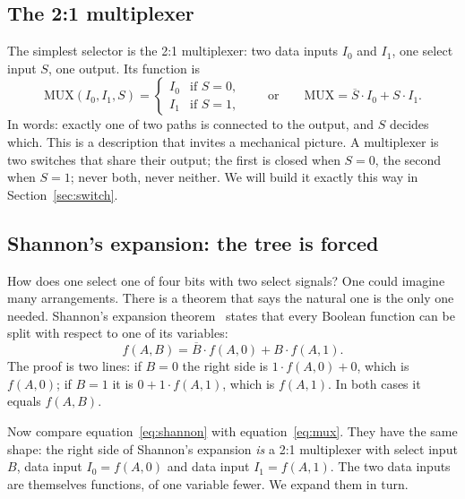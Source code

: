 \documentclass[11pt,a4paper]{article}
\newcommand{\ovl}[1]{\overline{#1}}
\begin{document}
\subsection{The 2:1 multiplexer}

The simplest selector is the 2:1 multiplexer: two data inputs $I_0$ and
$I_1$, one select input $S$, one output. Its function is
\begin{equation}
    \mathrm{MUX}(I_0,I_1,S) = \begin{cases} I_0 & \text{if } S=0,\\
                                             I_1 & \text{if } S=1,\end{cases}
    \qquad\text{or}\qquad
    \mathrm{MUX} = \ovl{S}\cdot I_0 + S\cdot I_1 .
    \label{eq:mux}
\end{equation}
In words: exactly one of two paths is connected to the output, and $S$
decides which. This is a description that invites a mechanical picture.
A multiplexer is two switches that share their output; the first is
closed when $S=0$, the second when $S=1$; never both, never neither.
We will build it exactly this way in Section~\ref{sec:switch}.

\subsection{Shannon's expansion: the tree is forced}

How does one select one of four bits with two select signals? One could
imagine many arrangements. There is a theorem that says the natural
one is the only one needed. Shannon's expansion
theorem~\cite{Shannon1938,Shannon1949} states that every Boolean
function can be split with respect to one of its variables:
\begin{equation}
    f(A,B) = \ovl{B}\cdot f(A,0) + B\cdot f(A,1).
    \label{eq:shannon}
\end{equation}
The proof is two lines: if $B=0$ the right side is $1\cdot f(A,0)+0$,
which is $f(A,0)$; if $B=1$ it is $0+1\cdot f(A,1)$, which is $f(A,1)$.
In both cases it equals $f(A,B)$.

Now compare equation~\eqref{eq:shannon} with
equation~\eqref{eq:mux}. They have the same shape: the right side of
Shannon's expansion \emph{is} a 2:1 multiplexer with select input $B$,
data input $I_0 = f(A,0)$ and data input $I_1 = f(A,1)$. The two data
inputs are themselves functions, of one variable fewer. We expand them
in turn.
\end{document}
